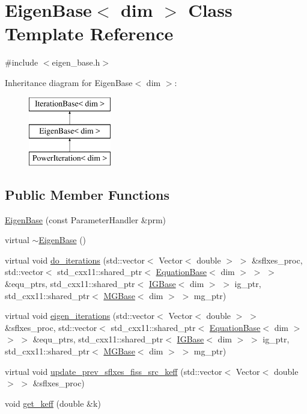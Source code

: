 \hypertarget{class_eigen_base}{}\section{Eigen\+Base$<$ dim $>$ Class Template Reference}
\label{class_eigen_base}


{\ttfamily \#include $<$eigen\+\_\+base.\+h$>$}

Inheritance diagram for Eigen\+Base$<$ dim $>$\+:\begin{figure}[H]
\begin{center}
\leavevmode
\includegraphics[height=3.000000cm]{class_eigen_base}
\end{center}
\end{figure}
\subsection*{Public Member Functions}
\begin{DoxyCompactItemize}
\item 
\hyperlink{class_eigen_base_a041823ed11437980ff73ada87a9717fe}{Eigen\+Base} (const Parameter\+Handler \&prm)
\item 
virtual \hyperlink{class_eigen_base_afe9efbe26f3d5a427caa1d5022555038}{$\sim$\+Eigen\+Base} ()
\item 
virtual void \hyperlink{class_eigen_base_a8a9ef8878e5b7199aa662f2b61b2d864}{do\+\_\+iterations} (std\+::vector$<$ Vector$<$ double $>$ $>$ \&sflxes\+\_\+proc, std\+::vector$<$ std\+\_\+cxx11\+::shared\+\_\+ptr$<$ \hyperlink{class_equation_base}{Equation\+Base}$<$ dim $>$ $>$ $>$ \&equ\+\_\+ptrs, std\+\_\+cxx11\+::shared\+\_\+ptr$<$ \hyperlink{class_i_g_base}{I\+G\+Base}$<$ dim $>$ $>$ ig\+\_\+ptr, std\+\_\+cxx11\+::shared\+\_\+ptr$<$ \hyperlink{class_m_g_base}{M\+G\+Base}$<$ dim $>$ $>$ mg\+\_\+ptr)
\item 
virtual void \hyperlink{class_eigen_base_ae09830ed4bcb14b7b699cd5f5460fab7}{eigen\+\_\+iterations} (std\+::vector$<$ Vector$<$ double $>$ $>$ \&sflxes\+\_\+proc, std\+::vector$<$ std\+\_\+cxx11\+::shared\+\_\+ptr$<$ \hyperlink{class_equation_base}{Equation\+Base}$<$ dim $>$ $>$ $>$ \&equ\+\_\+ptrs, std\+\_\+cxx11\+::shared\+\_\+ptr$<$ \hyperlink{class_i_g_base}{I\+G\+Base}$<$ dim $>$ $>$ ig\+\_\+ptr, std\+\_\+cxx11\+::shared\+\_\+ptr$<$ \hyperlink{class_m_g_base}{M\+G\+Base}$<$ dim $>$ $>$ mg\+\_\+ptr)
\item 
virtual void \hyperlink{class_eigen_base_aa51c202e12e88c70652aefbe4d399f2b}{update\+\_\+prev\+\_\+sflxes\+\_\+fiss\+\_\+src\+\_\+keff} (std\+::vector$<$ Vector$<$ double $>$ $>$ \&sflxes\+\_\+proc)
\item 
void \hyperlink{class_eigen_base_aeb0646a8338d5929cb33d5d7aee49e08}{get\+\_\+keff} (double \&k)
\end{DoxyCompactItemize}
